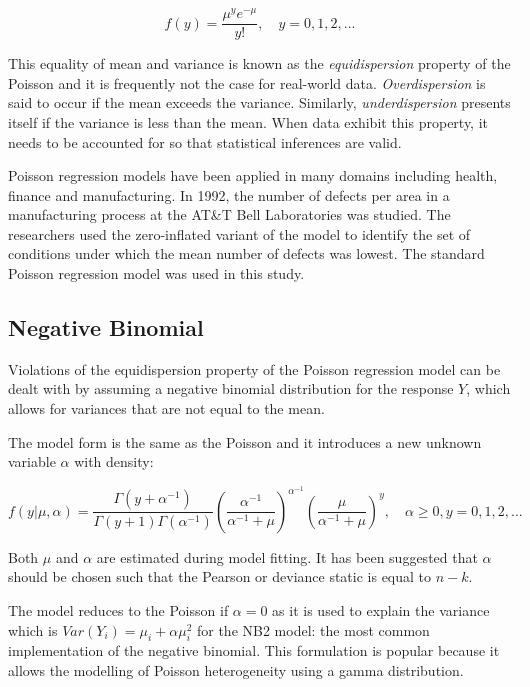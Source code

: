 \documentclass{thesis}
\begin{document}
\begin{equation}
f(y) = \frac{\mu^ye^{-\mu}}{y!},\hspace{1em}y = 0, 1, 2,...
\label{eq:possion-pmf}
\end{equation}

This equality of mean and variance is known as the \textit{equidispersion} property of the Poisson and it is frequently not the case for real-world data. \textit{Overdispersion} is said to occur if the mean exceeds the variance. Similarly, \textit{underdispersion} presents itself if the variance is less than the mean. When data exhibit this property, it needs to be accounted for so that statistical inferences are valid\cite{understanding-poisson}.

Poisson regression models have been applied in many domains including health, finance and manufacturing. In 1992, the number of defects per area in a manufacturing process at the AT\&T Bell Laboratories was studied\cite{defects}. The researchers used the zero-inflated variant of the model to identify the set of conditions under which the mean number of defects was lowest. The standard Poisson regression model was used in this study.

\subsection{Negative Binomial}

Violations of the equidispersion property of the Poisson regression model can be dealt with by assuming a negative binomial distribution for the response $Y$, which allows for variances that are not equal to the mean.

The model form is the same as the Poisson and it introduces a new unknown variable $\alpha$ with density:

\begin{equation}
    f(y|\mu,\alpha) = \frac{\Gamma(y + \alpha^{-1})}{\Gamma(y+1)\Gamma(\alpha^{-1})}(\frac{\alpha^{-1}}{\alpha^{-1} + \mu})^{\alpha^{-1}}(\frac{\mu}{\alpha^{-1} + \mu})^y,\hspace{1em}\alpha\ge 0, y=0,1,2,...
\end{equation}

Both $\mu$ and $\alpha$ are estimated during model fitting. It has been suggested that $\alpha$ should be chosen such that the Pearson or deviance static is equal to $n - k$\cite{cameron_trivedi_2013}.

The model reduces to the Poisson if $\alpha = 0$ as it is used to explain the variance which is $Var(Y_i) = \mu_i + \alpha\mu_i^2$ for the NB2 model: the most common implementation of the negative binomial\cite{cameron_trivedi_2013}. This formulation is popular because it allows the modelling of Poisson heterogeneity using a gamma distribution\cite{ncss-neg-bin}.
\end{document}
